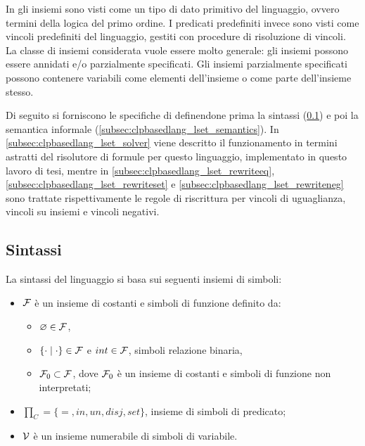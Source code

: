 \documentclass[12pt,a4paper,openright]{book} %
\begin{document}
In \lset{} gli insiemi sono visti come un tipo di dato primitivo del
linguaggio, ovvero termini della logica del primo ordine. I predicati
predefiniti invece sono visti come vincoli predefiniti del linguaggio,
gestiti con procedure di risoluzione di vincoli. La classe di insiemi
considerata vuole essere molto generale: gli insiemi possono essere
annidati e/o parzialmente specificati. Gli insiemi parzialmente
specificati possono contenere variabili come elementi dell’insieme o
come parte dell’insieme stesso.

Di seguito si forniscono le specifiche di \lset{} definendone prima la
sintassi (\ref{subsec:clpbasedlang_lset_sintax}) e poi la semantica
informale (\ref{subsec:clpbasedlang_lset_semantics}). In
\ref{subsec:clpbasedlang_lset_solver} viene descritto il funzionamento
in termini astratti del risolutore di formule per questo linguaggio,
implementato in questo lavoro di tesi, mentre in
\ref{subsec:clpbasedlang_lset_rewriteeq},
\ref{subsec:clpbasedlang_lset_rewriteset} e
\ref{subsec:clpbasedlang_lset_rewriteneg} sono trattate
rispettivamente le regole di riscrittura per vincoli di uguaglianza,
vincoli su insiemi e vincoli negativi.

\subsection{Sintassi}
\label{subsec:clpbasedlang_lset_sintax}

La sintassi del linguaggio \lset{} si basa sui seguenti insiemi di simboli:

\begin{itemize}
	\item $\mathcal{F}$ è un insieme di costanti e simboli di funzione
          definito da:
	\begin{itemize}
		\item $\varnothing \in \mathcal{F}$,
		\item $\{ \cdot \mid \cdot \} \in \mathcal{F}$ e $int \in
                  \mathcal{F}$, simboli relazione binaria,
		\item $\mathcal{F}_0 \subset \mathcal{F}$, dove $\mathcal{F}_0$ è un
                  insieme di costanti e simboli di funzione non
                  interpretati;
	\end{itemize}
	\item $\prod_C = \{ =, in, un, disj, set \}$, insieme di
          simboli di predicato;
	\item $\mathcal{V}$ è un insieme numerabile di simboli di variabile.
\end{itemize}
\end{document}
